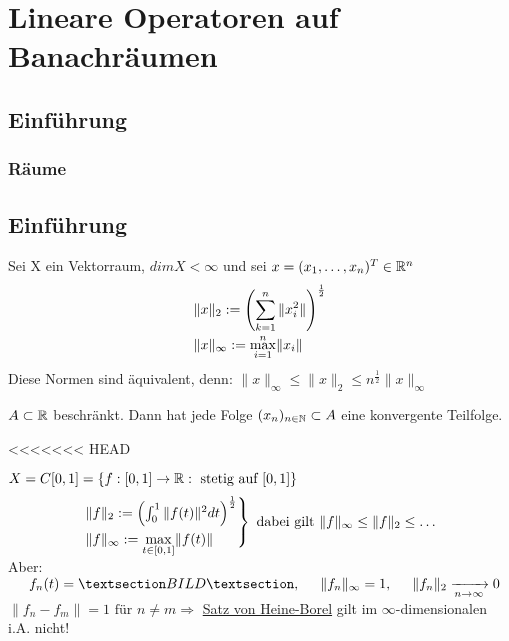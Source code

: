 
\chapter{Lineare Operatoren auf Banachräumen}
\section{Einführung}
\subsection{Räume}

\section{Einführung}

Sei X ein Vektorraum, $dim X < \infty $ und sei $x = (x_{1},\dotsc,x_{n})^{T} \in \mathbb{R}^{n}$
\begin{align*}
	& \|x\|_{2} := \left(\sum_{k = 1}^{n} \|x_{i}^{2}\| \right)^{\frac{1}{2}}\\
	& \|x\|_{\infty} := \smash{\displaystyle\max_{i = 1}^{n}}  \|x_{i}\|		
\end{align*}

Diese Normen sind äquivalent, denn:
$\| x \|_{\infty} \leq \| x \|_{2} \leq n^{\frac{1}{2}} \| x \|_{\infty}$ \newline

\begin{satz*} \label{s:1-heineborell} 
$A \subset \mathbb{R}$ beschränkt. Dann hat jede Folge $(x_{n})_{n \in \mathbb{N}} \subset A$ eine konvergente Teilfolge.
\end{satz*}

<<<<<<< HEAD
\begin{beispiel}
$X = C[0, 1] = \{ f : [0, 1] \rightarrow \mathbb{R}: \text{ stetig auf } [0, 1] \}$
\begin{align*}
\begin{rcases*}
\| f \|_{2} := \left( \int_{0}^{1} \| f(t) \|^{2} dt \right)^{\frac{1}{2}} \\
\| f \|_{\infty} :=  \smash{\displaystyle\max_{t \in [0, 1]}}  \| f(t) \|
\end{rcases*}\text{ dabei gilt } \| f \|_{\infty} \leq \| f \|_{2} \leq \dotsc 
\end{align*}
\newline
Aber:$\hspace{0.5cm} f_n(t) = §BILD§, \hspace{0.5cm} \| f_n \|_{\infty} = 1, \hspace{0.5cm} \| f_n \|_{2} \xrightarrow[n \rightarrow \infty]{} 0  $ \\
$ \| f_{n} - f_{m} \| = 1 \text{ für } n \neq m \Rightarrow $ \hyperref[s:1-heineborell]{ Satz von Heine-Borel} gilt im $\infty$-dimensionalen i.A. nicht!
\end{beispiel}

